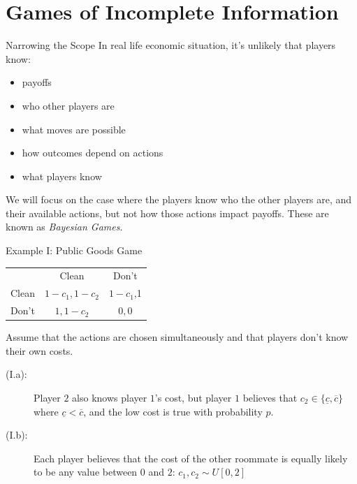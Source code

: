 \documentclass[10pt]{extarticle}
\begin{document}
  \section*{Games of Incomplete Information}%
  \begin{problem}{Narrowing the Scope}
    In real life economic situation, it's unlikely that players know:
    \begin{itemize}
      \item payoffs
      \item who other players are
      \item what moves are possible
      \item how outcomes depend on actions
      \item what players know
    \end{itemize}
    We will focus on the case where the players know who the other players are, and their available actions, but not how those actions impact payoffs. These are known as \textit{Bayesian Games}.
  \end{problem}
  \begin{problem}{Example I: Public Goods Game}
    \begin{center}
      \renewcommand{\arraystretch}{1.5}
      \begin{tabular}{c|c|c|}
        \multicolumn{1}{c}{} & \multicolumn{1}{c}{Clean} & \multicolumn{1}{c}{Don't}\\
        \cline{2-3}
        Clean & $1-c_1,1-c_2$ & $1-c_1$,1\\
        \cline{2-3}
        Don't & $1,1-c_2$ & $0,0$\\
        \cline{2-3}
      \end{tabular}
    \end{center}
    Assume that the actions are chosen simultaneously and that players don't know their own costs.
    \begin{description}
      \item[(I.a):] Player $2$ also knows player $1$'s cost, but player $1$ believes that $c_2 \in \{\underline{c},\overline{c}\}$ where $\underline{c}< \overline{c}$, and the low cost is true with probability $p$.
      \item[(I.b):] Each player believes that the cost of the other roommate is equally likely to be any value between $0$ and $2$: $c_1,c_2 \sim U[0,2]$
    \end{description}
  \end{problem}
\end{document}
